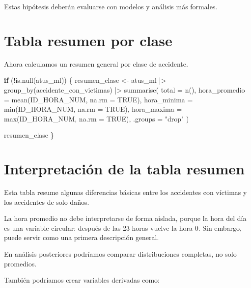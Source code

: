 \documentclass[
  11pt,
  letterpaper,
]{book}
\newenvironment{Shaded}{\begin{snugshade}}{\end{snugshade}}
\newcommand{\AttributeTok}[1]{\textcolor[rgb]{0.40,0.45,0.13}{#1}}
\newcommand{\ConstantTok}[1]{\textcolor[rgb]{0.56,0.35,0.01}{#1}}
\newcommand{\ControlFlowTok}[1]{\textcolor[rgb]{0.00,0.23,0.31}{\textbf{#1}}}
\newcommand{\FunctionTok}[1]{\textcolor[rgb]{0.28,0.35,0.67}{#1}}
\newcommand{\NormalTok}[1]{\textcolor[rgb]{0.00,0.23,0.31}{#1}}
\newcommand{\OtherTok}[1]{\textcolor[rgb]{0.00,0.23,0.31}{#1}}
\newcommand{\SpecialCharTok}[1]{\textcolor[rgb]{0.37,0.37,0.37}{#1}}
\newcommand{\StringTok}[1]{\textcolor[rgb]{0.13,0.47,0.30}{#1}}
\begin{document}
Estas hipótesis deberán evaluarse con modelos y análisis más formales.

\section{Tabla resumen por clase}\label{tabla-resumen-por-clase}

Ahora calculamos un resumen general por clase de accidente.

\begin{Shaded}
\begin{Highlighting}[]
\ControlFlowTok{if}\NormalTok{ (}\SpecialCharTok{!}\FunctionTok{is.null}\NormalTok{(atus\_ml)) \{}
\NormalTok{  resumen\_clase }\OtherTok{\textless{}{-}}\NormalTok{ atus\_ml }\SpecialCharTok{|\textgreater{}}
    \FunctionTok{group\_by}\NormalTok{(accidente\_con\_victimas) }\SpecialCharTok{|\textgreater{}}
    \FunctionTok{summarise}\NormalTok{(}
      \AttributeTok{total =} \FunctionTok{n}\NormalTok{(),}
      \AttributeTok{hora\_promedio =} \FunctionTok{mean}\NormalTok{(ID\_HORA\_NUM, }\AttributeTok{na.rm =} \ConstantTok{TRUE}\NormalTok{),}
      \AttributeTok{hora\_minima =} \FunctionTok{min}\NormalTok{(ID\_HORA\_NUM, }\AttributeTok{na.rm =} \ConstantTok{TRUE}\NormalTok{),}
      \AttributeTok{hora\_maxima =} \FunctionTok{max}\NormalTok{(ID\_HORA\_NUM, }\AttributeTok{na.rm =} \ConstantTok{TRUE}\NormalTok{),}
      \AttributeTok{.groups =} \StringTok{"drop"}
\NormalTok{    )}

\NormalTok{  resumen\_clase}
\NormalTok{\}}
\end{Highlighting}
\end{Shaded}

\section{Interpretación de la tabla
resumen}\label{interpretaciuxf3n-de-la-tabla-resumen}

Esta tabla resume algunas diferencias básicas entre los accidentes con
víctimas y los accidentes de solo daños.

La hora promedio no debe interpretarse de forma aislada, porque la hora
del día es una variable circular: después de las 23 horas vuelve la hora
0. Sin embargo, puede servir como una primera descripción general.

En análisis posteriores podríamos comparar distribuciones completas, no
solo promedios.

También podríamos crear variables derivadas como:
\end{document}
